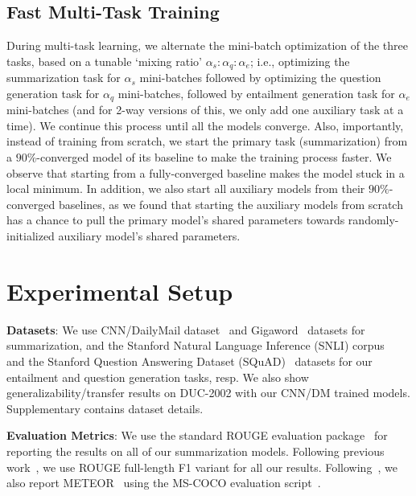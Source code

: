 \documentclass[11pt,a4paper]{article}
\begin{document}
\subsection{Fast Multi-Task Training}
During multi-task learning, we alternate the mini-batch optimization of the three tasks, based on a tunable `mixing ratio' $\alpha_s:\alpha_q:\alpha_e$; i.e., optimizing the summarization task for $\alpha_s$ mini-batches followed by optimizing the question generation task for $\alpha_q$ mini-batches, followed by entailment generation task for $\alpha_e$ mini-batches (and for 2-way versions of this, we only add one auxiliary task at a time). We continue this process  until all the models converge. Also, importantly, instead of training from scratch, we start the primary task (summarization) from a $90\%$-converged model of its baseline to make the training process faster. We observe that starting from a fully-converged baseline makes the model stuck in a local minimum. In addition, we also start all auxiliary models from their $90\%$-converged baselines, as we found that starting the auxiliary models from scratch has a chance to pull the primary model's shared parameters towards randomly-initialized auxiliary model's shared parameters.




 
\section{Experimental Setup}
\label{sec-setup}

\label{sec:datasets}
\noindent\textbf{Datasets}: We use CNN/DailyMail dataset~\cite{hermann2015teaching,nallapati2016abstractive} and Gigaword~\cite{rush2015neural} datasets for summarization, and the Stanford Natural Language Inference (SNLI) corpus~\cite{bowman2015large} and the Stanford Question Answering Dataset (SQuAD)~\cite{rajpurkar2016squad} datasets for our entailment and question generation tasks, resp. We also show generalizability/transfer results on DUC-2002 with our CNN/DM trained models. Supplementary contains dataset details.

\noindent\textbf{Evaluation Metrics}: We use the standard ROUGE evaluation package~\cite{lin2004rouge} for reporting the results on all of our summarization models. Following previous work~\cite{chopra2016abstractive,nallapati2016abstractive}, we use ROUGE full-length F1 variant for all our results.
Following~, we also report METEOR~\cite{banerjee2005meteor} using the MS-COCO evaluation script~\cite{chen2015microsoft}.
\end{document}
